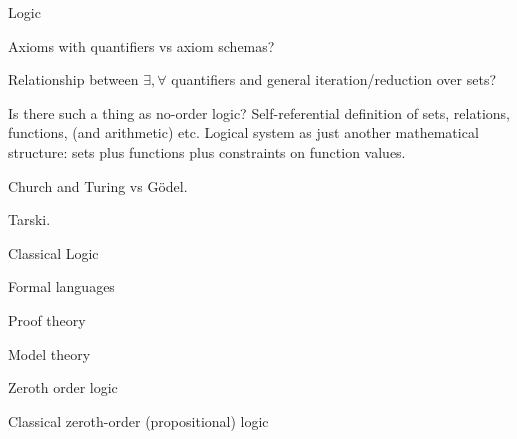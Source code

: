 \begin{plSection}{Logic}
\label{sec:Logic}



Axioms with quantifiers vs axiom schemas?

Relationship between $\exists, \forall$ quantifiers
and general iteration/reduction over sets?

Is there such a thing as no-order logic?
Self-referential definition of sets, relations, functions,
(and arithmetic) etc. 
Logical system  as just another mathematical structure:
sets plus functions plus constraints on function values.

Church and Turing vs G\"{o}del.

Tarski.

\begin{plSection}{Classical Logic}
\label{sec:Classical Logic}


\end{plSection}%
\begin{plSection}{Formal languages}
\label{sec:Formal_languages}


\end{plSection}%
\begin{plSection}{Proof theory}
\label{sec:Proof_theory}

\end{plSection}%
\begin{plSection}{Model theory}
\label{sec:Model_theory}

\end{plSection}%
\begin{plSection}{Zeroth order logic}
\label{sec:Zeroth_order_logic}

Classical zeroth-order (propositional) 
logic~


\end{plSection}
\end{plSection}
